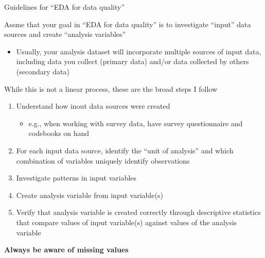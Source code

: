 \documentclass[8pt,ignorenonframetext,dvipsnames]{beamer}
\providecommand{\tightlist}{%
  \setlength{\itemsep}{0pt}\setlength{\parskip}{0pt}}
\renewcommand{\textbf}[1]{{\color{darkgray}\bfseries\fontfamily{Montserrat-TOsF}#1}}
\let\olditem\item
\renewcommand{\item}{%
  \olditem\vspace{4pt}
}
\begin{document}
\begin{frame}{Guidelines for ``EDA for data quality''}

Assme that your goal in ``EDA for data quality'' is to investigate
``input'' data sources and create ``analysis variables''

\begin{itemize}
\tightlist
\item
  Usually, your analysis dataset will incorporate multiple sources of
  input data, including data you collect (primary data) and/or data
  collected by others (secondary data)
\end{itemize}

While this is not a linear process, these are the broad steps I follow

\begin{enumerate}
\def\labelenumi{\arabic{enumi}.}
\tightlist
\item
  Understand how inout data sources were created

  \begin{itemize}
  \tightlist
  \item
    e.g., when working with survey data, have survey questionnaire and
    codebooks on hand
  \end{itemize}
\item
  For each input data source, identify the ``unit of analysis'' and
  which combination of variables uniquely identify observations
\item
  Investigate patterns in input variables
\item
  Create analysis variable from input variable(s)
\item
  Verify that analysis variable is created correctly through descriptive
  statistics that compare values of input variable(s) against values of
  the analysis variable
\end{enumerate}

\textbf{Always be aware of missing values}

\end{frame}
\end{document}

